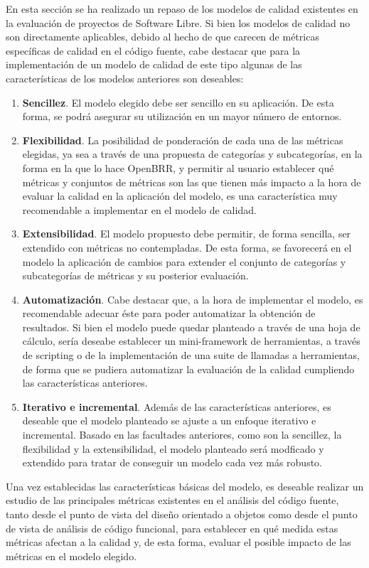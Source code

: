 \documentclass[11pt]{article}
\begin{document}
En esta sección se ha realizado un repaso de los modelos de calidad existentes en la evaluación de proyectos de Software Libre. Si bien los modelos de calidad no son directamente aplicables, debido al hecho de que carecen de métricas específicas de calidad en el código fuente, cabe destacar que para la implementación de un modelo de calidad de este tipo algunas de las características de los modelos anteriores son deseables:

\begin{enumerate}
\item{\textbf{Sencillez}}. El modelo elegido debe ser sencillo en su aplicación. De esta forma, se podrá asegurar su utilización en un mayor número de entornos.
\item{\textbf{Flexibilidad}}. La posibilidad de ponderación de cada una de las métricas elegidas, ya sea a través de una propuesta de categorías y subcategorías, en la forma en la que lo hace OpenBRR, y permitir al usuario establecer qué métricas y conjuntos de métricas son las que tienen más impacto a la hora de evaluar la calidad en la aplicación del modelo, es una característica muy recomendable a implementar en el modelo de calidad.
\item{\textbf{Extensibilidad}}. El modelo propuesto debe permitir, de forma sencilla, ser extendido con métricas no contempladas. De esta forma, se favorecerá en el modelo la aplicación de cambios para extender el conjunto de categorías y subcategorías de métricas y su posterior evaluación.
\item{\textbf{Automatización}}. Cabe destacar que, a la hora de implementar el modelo, es recomendable adecuar éste para poder automatizar la obtención de resultados. Si bien el modelo puede quedar planteado a través de una hoja de cálculo, sería deseabe establecer un mini-framework de herramientas, a través de scripting o de la implementación de una suite de llamadas a herramientas, de forma que se pudiera automatizar la evaluación de la calidad cumpliendo las características anteriores.
\item{\textbf{Iterativo e incremental}}. Además de las características anteriores, es deseable que el modelo planteado se ajuste a un enfoque iterativo e incremental. Basado en las facultades anteriores, como son la sencillez, la flexibilidad y la extensibilidad, el modelo planteado será modficado y extendido para tratar de conseguir un modelo cada vez más robusto.
\end{enumerate}

Una vez establecidas las características básicas del modelo, es deseable realizar un estudio de las principales métricas existentes en el análisis del código fuente, tanto desde el punto de vista del diseño orientado a objetos como desde el punto de vista de análisis de código funcional, para establecer en qué medida estas métricas afectan a la calidad y, de esta forma, evaluar el posible impacto de las métricas en el modelo elegido.
\end{document}
